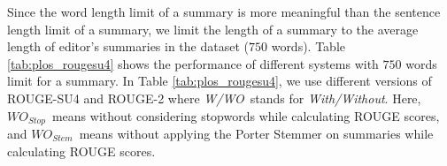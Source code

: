 
Since the word length limit of a summary is more meaningful than the sentence length limit of a summary, we limit the length of a summary to the average length of editor's summaries in the dataset
($750$ words). Table \ref{tab:plos_rougesu4} shows the performance of different systems with $750$ words limit for a summary. %
In Table \ref{tab:plos_rougesu4},
we use different versions of ROUGE-SU4 and ROUGE-2 where \emph{W/WO}\ stands for \emph{With/Without}.
Here, \emph{$WO_{Stop}$}\ means without considering stopwords while calculating ROUGE scores, and \emph{$WO_{Stem}$}\ means without applying the Porter Stemmer on summaries while calculating ROUGE scores.
%
 
